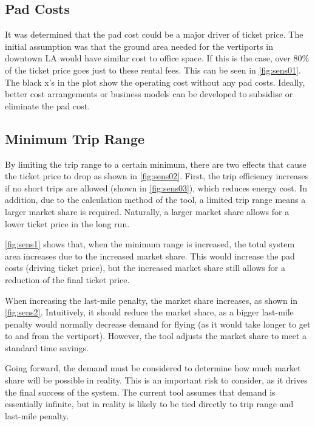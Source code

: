 \subsection{Pad Costs}
It was determined that the pad cost could be a major driver of ticket price. The initial assumption was that the ground area needed for the vertiports in downtown LA would have similar cost to office space. If this is the case, over 80\% of the ticket price goes just to these rental fees. This can be seen in \autoref{fig:sens01}. The black x's in the plot show the operating cost without any pad costs. Ideally, better cost arrangements or business models can be developed to subsidise or eliminate the pad cost.


\subsection{Minimum Trip Range}
By limiting the trip range to a certain minimum, there are two effects that cause the ticket price to drop as shown in \autoref{fig:sens02}. First, the trip efficiency increases if no short trips are allowed (shown in \autoref{fig:sens03}), which reduces energy cost. In addition, due to the calculation method of the tool, a limited trip range means a larger market share is required. Naturally, a larger market share allows for a lower ticket price in the long run. 

\autoref{fig:sens1} shows that, when the minimum range is increased, the total system area increases due to the increased market share. This would increase the pad costs (driving ticket price), but the increased market share still allows for a reduction of the final ticket price. 

When increasing the last-mile penalty, the market share increases, as shown in \autoref{fig:sens2}. Intuitively, it should reduce the market share, as a bigger last-mile penalty would normally decrease demand for flying (as it would take longer to get to and from the vertiport). However, the tool adjusts the market share to meet a standard time savings.

Going forward, the demand must be considered to determine how much market share will be possible in reality. This is an important risk to consider, as it drives the final success of the system. The current tool assumes that demand is essentially infinite, but in reality is likely to be tied directly to trip range and last-mile penalty.


